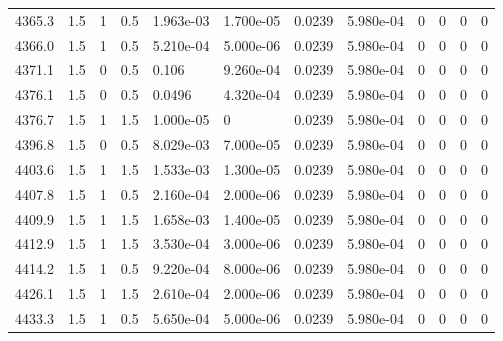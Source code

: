 \documentclass[preview]{standalone}
\begin{document}
{{{{{{{{{{{{{{{{{\begin{tabular}{L{1.2cm}C{1.2cm} C{0.3cm}C{0.5cm} C{1.4cm}C{1.4cm} C{1.4cm}C{1.4cm} C{1.6cm}C{1.6cm} C{1.6cm}C{1.6cm}}
  4365.3  &   1.5  & 1     & 0.5 &  1.963e-03  & 1.700e-05  &  0.0239&   5.980e-04& 0 & 0   &  0 & 0  \\ 
  4366.0  &   1.5  & 1     & 0.5 &  5.210e-04  & 5.000e-06  &  0.0239&   5.980e-04& 0 & 0   &  0 & 0  \\ 
  4371.1  &   1.5  & 0     & 0.5 &  0.106  & 9.260e-04  &  0.0239&   5.980e-04& 0 & 0   &  0 & 0  \\ 
  4376.1  &   1.5  & 0     & 0.5 &  0.0496  & 4.320e-04  &  0.0239&   5.980e-04& 0 & 0   &  0 & 0  \\ 
  4376.7  &   1.5  & 1     & 1.5 &  1.000e-05  & 0  &  0.0239&   5.980e-04& 0 & 0   &  0 & 0  \\ 
  4396.8  &   1.5  & 0     & 0.5 &  8.029e-03  & 7.000e-05  &  0.0239&   5.980e-04& 0 & 0   &  0 & 0  \\ 
  4403.6  &   1.5  & 1     & 1.5 &  1.533e-03  & 1.300e-05  &  0.0239&   5.980e-04& 0 & 0   &  0 & 0  \\ 
  4407.8  &   1.5  & 1     & 0.5 &  2.160e-04  & 2.000e-06  &  0.0239&   5.980e-04& 0 & 0   &  0 & 0  \\ 
  4409.9  &   1.5  & 1     & 1.5 &  1.658e-03  & 1.400e-05  &  0.0239&   5.980e-04& 0 & 0   &  0 & 0  \\ 
  4412.9  &   1.5  & 1     & 1.5 &  3.530e-04  & 3.000e-06  &  0.0239&   5.980e-04& 0 & 0   &  0 & 0  \\ 
  4414.2  &   1.5  & 1     & 0.5 &  9.220e-04  & 8.000e-06  &  0.0239&   5.980e-04& 0 & 0   &  0 & 0  \\ 
  4426.1  &   1.5  & 1     & 1.5 &  2.610e-04  & 2.000e-06  &  0.0239&   5.980e-04& 0 & 0   &  0 & 0  \\ 
  4433.3  &   1.5  & 1     & 0.5 &  5.650e-04  & 5.000e-06  &  0.0239&   5.980e-04& 0 & 0   &  0 & 0  \\ 
\hline 
\end{tabular} 

}}}}}}}}}}}}}}}}}
\end{document}
